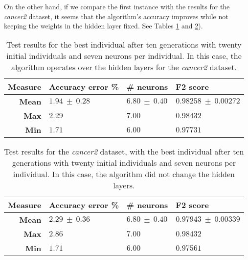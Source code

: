 \documentclass[runningheads]{llncs}
\begin{document}
On the other hand, if we compare the first instance with the results for the
\emph{cancer2} dataset, it seems that the algorithm's accuracy improves while
not keeping the weights in the hidden layer fixed. See Tables
\ref{tab:fixed-7-1-noconst-can2} and \ref{tab:fixed-7-1-const-can2}).

 \begin{table}
     \centering
     \caption{
Test results for the best individual after ten generations with twenty initial
individuals and seven neurons per individual. In this case, the algorithm
operates over the hidden layers for the \emph{cancer2} dataset.
     }
     \label{tab:fixed-7-1-noconst-can2}
     \begin{tabular}{rlll}
         \textbf{Measure}   & \textbf{Accuracy error \%} & \textbf{\# neurons} & \textbf{F2 score} \\
         \hline
         \textbf{Mean}      & $1.94\ \pm\ 0.28$ & $6.80\ \pm\ 0.40$  & $0.98258\ \pm\ 0.00272$ \\
         \textbf{Max}       & $2.29$            & $7.00$             & $0.98432$               \\
         \textbf{Min}       & $1.71$            & $6.00$             & $0.97731$               \\
     \end{tabular}
 \end{table}

 \begin{table}
     \centering
     \caption{
Test results for the \emph{cancer2} dataset, with the best individual after ten
generations with twenty initial individuals and seven neurons per individual. In
this case, the algorithm did not change the hidden layers.
     }
     \label{tab:fixed-7-1-const-can2}
     \begin{tabular}{rlll}
         \textbf{Measure}   & \textbf{Accuracy error \%} & \textbf{\# neurons} & \textbf{F2 score} \\
         \hline
         \textbf{Mean}      & $2.29\ \pm\ 0.36$ & $6.80\ \pm\ 0.40$  & $0.97943\ \pm\ 0.00339$ \\
         \textbf{Max}       & $2.86$            & $7.00$             & $0.98432$               \\
         \textbf{Min}       & $1.71$            & $6.00$             & $0.97561$               \\
     \end{tabular}
   \end{table}
\end{document}
